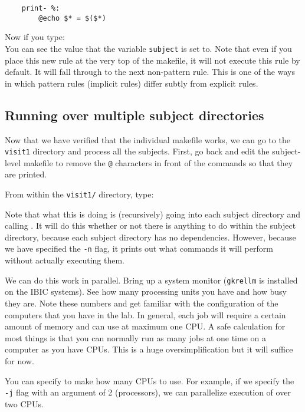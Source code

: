 \begin{lstlisting}
	print- %:
		@echo $* = $($*)
\end{lstlisting}

Now if you type:  \\
You can see the value that the variable \texttt{subject} is set to. Note that even if you place this new rule at the very top of the makefile, it will not execute this rule by default. It will fall through to the next non-pattern rule. This is one of the ways in which pattern rules (implicit rules) differ subtly from explicit rules. 

\subsection{Running \maken{} over multiple subject directories}
Now that we have verified that the individual makefile works, we can
go to the \texttt{visit1} directory and process all the
subjects. First, go back and edit the subject-level makefile to remove
the \texttt{@} characters in front of the commands so that they are
printed.

From within the \texttt{visit1/} directory, type:

Note that what this is doing is (recursively) going into each subject directory and calling \maken{}. It will do this whether or not there is anything to do within the subject directory, because each subject directory has no dependencies. However, because we have specified the \texttt{-n} flag, it prints out what commands it will perform without actually executing them.

We can do this work in parallel. Bring up a system monitor (\texttt{gkrellm} is installed on the IBIC systems). See how many processing units you have and how busy they are. Note these numbers and get familiar with the configuration of the computers that you have in the lab. In general, each job will require a certain amount of memory and can use at maximum one CPU. A safe calculation for most things is that you can normally run as many jobs at one time on a computer as you have CPUs. This is a huge oversimplification but it will suffice for now. 

You can specify to make how many CPUs to use. For example, if we specify the \texttt{ -j} flag with an argument of 2 (processors), we can parallelize execution of \maken{} over two CPUs. 

